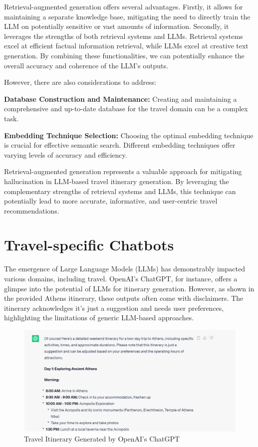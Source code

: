 \documentclass[12pt,a4paper]{report}
\begin{document}
Retrieval-augmented generation offers several advantages. Firstly, it allows for maintaining a separate knowledge base, mitigating the need to directly train the LLM on potentially sensitive or vast amounts of information. Secondly, it leverages the strengths of both retrieval systems and LLMs. Retrieval systems excel at efficient factual information retrieval, while LLMs excel at creative text generation. By combining these functionalities, we can potentially enhance the overall accuracy and coherence of the LLM's outputs.

However, there are also considerations to address:

\begin{description}
\item{\textbf{Database Construction and Maintenance:} Creating and maintaining a comprehensive and up-to-date database for the travel domain can be a complex task.}
\item{\textbf{Embedding Technique Selection:} Choosing the optimal embedding technique is crucial for effective semantic search. Different embedding techniques offer varying levels of accuracy and efficiency.}
\end{description}

Retrieval-augmented generation represents a valuable approach for mitigating hallucination in LLM-based travel itinerary generation. By leveraging the complementary strengths of retrieval systems and LLMs, this technique can potentially lead to more accurate, informative, and user-centric travel recommendations.

\section{Travel-specific Chatbots}

The emergence of Large Language Models (LLMs) has demonstrably impacted various domains, including travel. OpenAI's ChatGPT, for instance, offers a glimpse into the potential of LLMs for itinerary generation. However, as shown in the provided Athens itinerary, these outputs often come with disclaimers. The itinerary acknowledges it's just a suggestion and needs user preferences, highlighting the limitations of generic LLM-based approaches.


\begin{figure}[h]
    \centering
    \includegraphics[scale=.75]{chatgptitin}
    \caption{Travel Itinerary Generated by OpenAI's ChatGPT}
\end{figure}
\end{document}
